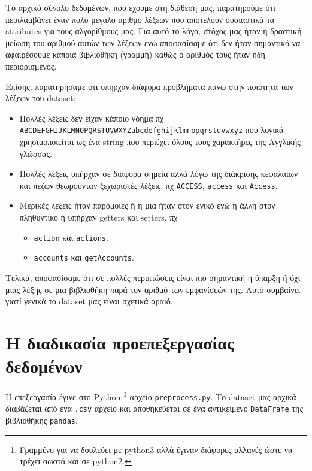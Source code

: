 Το αρχικό σύνολο δεδομένων, που έχουμε στη διάθεσή μας, παρατηρούμε ότι περιλαμβάνει έναν πολύ μεγάλο αριθμό λέξεων που αποτελούν ουσιαστικά τα attributes για τους αλγορίθμους μας.
Για αυτό το λόγο, στόχος μας ήταν η δραστική μείωση του αριθμού αυτών των λέξεων ενώ αποφασίσαμε ότι δεν ήταν σημαντικό να αφαιρέσουμε κάποια βιβλιοθήκη (γραμμή) καθώς ο αριθμός τους ήταν ήδη περιορισμένος.

Επίσης, παρατηρήσαμε ότι υπήρχαν διάφορα προβλήματα πάνω στην ποιότητα των λέξεων του dataset:
\begin{itemize}
    \item Πολλές λέξεις δεν είχαν κάποιο νόημα πχ
    \texttt{ABCDE\-FGHIJKLMNO\-PQRSTU\-VWXYZ\-abc\-d\-e\-f\-ghij\-klmnopqrstuvwxyz}
    που λογικά χρησιμοποιείται ως ένα string που περιέχει όλους τους χαρακτήρες της Αγγλικής γλώσσας.

    \item Πολλές λέξεις υπήρχαν σε διάφορα σημεία αλλά λόγω της διάκρισης κεφαλαίων και πεζών θεωρούνταν ξεχωριστές λέξεις.
    πχ \texttt{ACCESS}, \texttt{access} και \texttt{Access}.

    \item Μερικές λέξεις ήταν παρόμοιες ή η μια ήταν στον ενικό ενώ η άλλη στον πληθυντικό ή υπήρχαν getters και setters.
    πχ \begin{itemize}
        \item \texttt{action} και \texttt{actions}.
        \item \texttt{accounts} και \texttt{getAccounts}.
    \end{itemize}
\end{itemize}

Τελικά, αποφασίσαμε ότι σε πολλές περιπτώσεις είναι πιο σημαντική η ύπαρξη ή όχι μιας λέξης σε μια βιβλιοθήκη παρά τον αριθμό των εμφανίσεών της.
Αυτό συμβαίνει γιατί γενικά το dataset μας είναι σχετικά αραιό.

\section{Η διαδικασία προεπεξεργασίας δεδομένων}
Η επεξεργασία έγινε στο Python
\footnote{Γραμμένο για να δουλεύει με python3 αλλά έγιναν διάφορες αλλαγές ώστε να τρέχει σωστά και σε python2.}
αρχείο \texttt{preprocess.py}.
Το dataset μας αρχικά διαβάζεται από ένα \texttt{.csv} αρχείο και αποθηκεύεται σε ένα αντικείμενο \lstinline!DataFrame! της βιβλιοθήκης \lstinline!pandas!.

